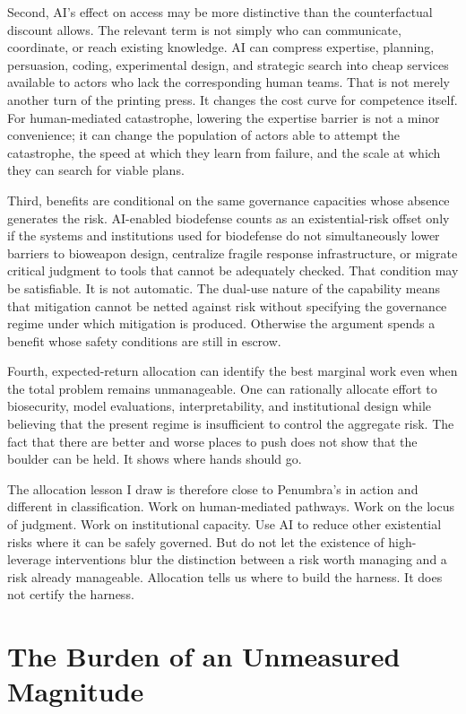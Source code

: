 \documentclass[11pt]{article}
\begin{document}
Second, AI's effect on access may be more distinctive than the counterfactual discount allows. The relevant term is not simply who can communicate, coordinate, or reach existing knowledge. AI can compress expertise, planning, persuasion, coding, experimental design, and strategic search into cheap services available to actors who lack the corresponding human teams. That is not merely another turn of the printing press. It changes the cost curve for competence itself. For human-mediated catastrophe, lowering the expertise barrier is not a minor convenience; it can change the population of actors able to attempt the catastrophe, the speed at which they learn from failure, and the scale at which they can search for viable plans.

Third, benefits are conditional on the same governance capacities whose absence generates the risk. AI-enabled biodefense counts as an existential-risk offset only if the systems and institutions used for biodefense do not simultaneously lower barriers to bioweapon design, centralize fragile response infrastructure, or migrate critical judgment to tools that cannot be adequately checked. That condition may be satisfiable. It is not automatic. The dual-use nature of the capability means that mitigation cannot be netted against risk without specifying the governance regime under which mitigation is produced. Otherwise the argument spends a benefit whose safety conditions are still in escrow.

Fourth, expected-return allocation can identify the best marginal work even when the total problem remains unmanageable. One can rationally allocate effort to biosecurity, model evaluations, interpretability, and institutional design while believing that the present regime is insufficient to control the aggregate risk. The fact that there are better and worse places to push does not show that the boulder can be held. It shows where hands should go.

The allocation lesson I draw is therefore close to Penumbra's in action and different in classification. Work on human-mediated pathways. Work on the locus of judgment. Work on institutional capacity. Use AI to reduce other existential risks where it can be safely governed. But do not let the existence of high-leverage interventions blur the distinction between a risk worth managing and a risk already manageable. Allocation tells us where to build the harness. It does not certify the harness.

\section{The Burden of an Unmeasured Magnitude}
\label{sec:burden}
\end{document}
